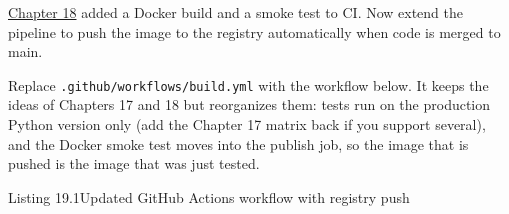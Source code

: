 \hyperref[ch:18-containerization]{Chapter 18} added a Docker build and a smoke test to CI. Now extend the pipeline to push the image to the registry automatically when code is merged to main.

Replace \texttt{.}\allowbreak{}\texttt{github/}\allowbreak{}\texttt{workflows/}\allowbreak{}\texttt{build.}\allowbreak{}\texttt{yml} with the workflow below. It keeps the ideas of Chapters 17 and 18 but reorganizes them: tests run on the production Python version only (add the Chapter 17 matrix back if you support several), and the Docker smoke test moves into the publish job, so the image that is pushed is the image that was just tested.

\begin{codeboxcap}{\textcolor{accent}{Listing 19.1}\enspace Updated GitHub Actions workflow with registry push}

\begin{Shaded}
\begin{Highlighting}[]
\KeywordTok{:}

\KeywordTok{:}
\AttributeTok{  }\KeywordTok{:}
\AttributeTok{    }\KeywordTok{:}\AttributeTok{ }\KeywordTok{[}\KeywordTok{]}
\AttributeTok{  }\KeywordTok{:}
\AttributeTok{    }\KeywordTok{:}\AttributeTok{ }\KeywordTok{[}\KeywordTok{]}

\KeywordTok{:}
\AttributeTok{  }\KeywordTok{:}
\AttributeTok{  }\KeywordTok{:}

\KeywordTok{:}
\AttributeTok{  }\KeywordTok{:}
\AttributeTok{  }\KeywordTok{:}

\KeywordTok{:}

\AttributeTok{  }\KeywordTok{:}
\AttributeTok{    }\KeywordTok{:}
\AttributeTok{    }\KeywordTok{:}


\end{Highlighting}
\end{Shaded}
\end{codeboxcap}
